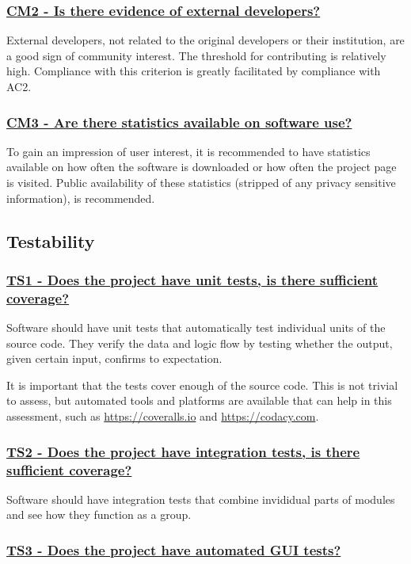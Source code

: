 \documentclass[a4paper,11pt]{article}
\newcommand{\criterion}[2]{\subsubsection*{\underline{#1 - #2}}\label{id:#1}}
\newcommand\CheckTable{%
  \begin{tabular}{ccccc}
    No & Minimal & Adequate & Good & Perfect \\
    0 & 1 & 2 & 3 & 4 \\
    \hline
    $\square$ & $\square$ & $\square$ & $\square$ & $\square$ \\
  \end{tabular}%
}
\begin{document}

\newcommand{\cmTwoID}{CM2}
\newcommand{\cmTwoText}{Is there evidence of external developers?}
\criterion{\cmTwoID}{\cmTwoText}

External developers, not related to the original developers or their
institution, are a good sign of community interest. The threshold for
contributing is relatively high. Compliance with this criterion is greatly
facilitated by compliance with AC2.


\newcommand{\cmThreeID}{CM3}
\newcommand{\cmThreeText}{Are there statistics available on software use?}
\criterion{\cmThreeID}{\cmThreeText}

To gain an impression of user interest, it is recommended to have statistics
available on how often the software is downloaded or how often the project page
is visited. Public availability of these statistics (stripped of any privacy
sensitive information), is recommended.


\subsection{Testability}\label{sec:tes}

\newcommand{\tsOneID}{TS1}
\newcommand{\tsOneText}{Does the project have unit tests, is there sufficient coverage?}
\criterion{\tsOneID}{\tsOneText}

Software should have unit tests that automatically test individual units of the
source code. They verify the data and logic flow by testing whether the output,
given certain input, confirms to expectation.

It is important that the tests cover enough of the source code. This is not
trivial to assess, but automated tools
and platforms are available that can help in this assessment, such as
\url{https://coveralls.io} and \url{https://codacy.com}.


\newcommand{\tsTwoID}{TS2}
\newcommand{\tsTwoText}{Does the project have integration tests, is there sufficient coverage?}
\criterion{\tsTwoID}{\tsTwoText}

Software should have integration tests that combine invididual parts of modules and see how they function
as a group.


\newcommand{\tsThreeID}{TS3}
\newcommand{\tsThreeText}{Does the project have automated GUI tests?}
\criterion{\tsThreeID}{\tsThreeText}
\end{document}
